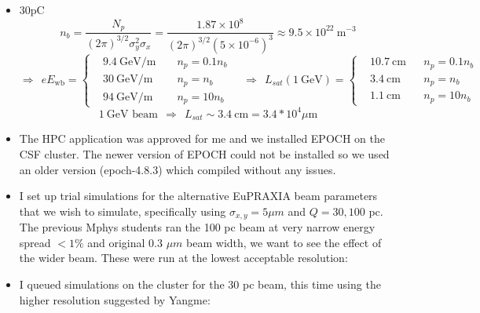 \documentclass[%
onecolumn, notitlepage,
 amsmath,amssymb,
 aps,
]{article}
\begin{document}
\begin{itemize}
$$\begin{aligned}
&54 ~\text{GeV/m} && n_p=n_b\\
&172 ~\text{GeV/m} &&n_p=10 n_b
\end{aligned}\right.\quad\Rightarrow ~~L_{sat}(1 ~\text{GeV})=\left\{\begin{aligned}
&5.8 ~\text{cm}&& n_p=0.1 n_b \\
&1.9 ~\text{cm} && n_p=n_b\\
&0.6 ~\text{cm} &&n_p=10 n_b
\end{aligned}\right.$$
$$1 ~\text{GeV beam} ~~\Rightarrow ~~ L_{sat}\sim 2 ~\text{cm}=2*10^4 \mu \text{m} $$
\item  30pC $$n_b=\frac{N_p}{(2\pi)^{3/2} \sigma_y^2\sigma_x}=\frac{1.87\times 10^{8}}{(2\pi)^{3/2} (5\times 10^{-6})^3}\approx 9.5\times 10^{22}~ \text{m}^{-3} $$
$$\Rightarrow ~~eE_{\text{wb}}=\left\{\begin{aligned}
&9.4 ~\text{GeV/m }&& n_p=0.1 n_b \\
&30 ~\text{GeV/m} && n_p=n_b\\
&94 ~\text{GeV/m} &&n_p=10 n_b
\end{aligned}\right.\quad\Rightarrow ~~L_{sat}(1 ~\text{GeV})=\left\{\begin{aligned}
&10.7 ~\text{cm}&& n_p=0.1 n_b \\
&3.4 ~\text{cm} && n_p=n_b\\
&1.1 ~\text{cm} &&n_p=10 n_b
\end{aligned}\right.$$
$$1 ~\text{GeV beam} ~~\Rightarrow ~~ L_{sat}\sim 3.4 ~\text{cm}=3.4*10^4 \mu \text{m} $$


\end{itemize}

\begin{itemize}
\item[\textcolor{MancPurple}{\textbullet}] The HPC application was approved for me and we installed EPOCH on the CSF cluster. The newer version of EPOCH could not be installed so we used an older version (epoch-4.8.3) which compiled without any issues. 
\item[\textcolor{MancPurple}{\textbullet}] I set up trial simulations for the alternative EuPRAXIA beam parameters that we wish to simulate, specifically using $\sigma_{x,y}=5 \mu m$ and $Q=30, 100$ pc. The previous Mphys students ran the 100 pc beam at very narrow energy spread $< 1\%$ and original 0.3 $\mu m$ beam width, we want to see the effect of the wider beam. These were run at the lowest acceptable resolution:
\item[\textcolor{MancPurple}{\textbullet}] I queued simulations on the cluster for the 30 pc beam, this time using the higher resolution suggested by Yangme:
\end{itemize}
\end{document}
